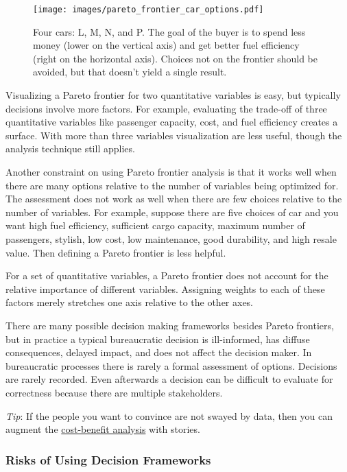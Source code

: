 \begin{figure}[ht]
    \centering
    \texttt{[image: images/pareto\_frontier\_car\_options.pdf]}
    \caption{Four cars: L, M, N, and P. The goal of the buyer is to spend less money (lower on the vertical axis) and get better fuel efficiency (right on the horizontal axis). Choices not on the frontier should be avoided, but that doesn't yield a single result.}
    \label{fig:pareto_frontier_cars}
\end{figure}

Visualizing a Pareto frontier for two quantitative variables is easy, but typically decisions involve more factors. For example, evaluating the trade-off of three quantitative variables like 
passenger capacity, cost, and fuel efficiency creates a surface. With more than three variables visualization are less useful, though the analysis technique still applies. 

Another constraint on using Pareto frontier analysis is that it works well when there are many options relative to the number of variables being optimized for. 
The assessment does not work as well when there are few choices relative to the number of variables. For example, suppose there are five choices of car and you want high fuel efficiency, sufficient cargo capacity, maximum number of passengers, stylish, low cost, low maintenance, good durability, and high resale value. Then defining a Pareto frontier is less helpful.

For a set of quantitative variables, a Pareto frontier does not account for the relative importance of different variables. Assigning weights to each of these factors merely stretches one axis relative to the other axes. 

There are many possible decision making frameworks besides Pareto frontiers, but in practice a typical bureaucratic decision is ill-informed, has diffuse consequences, delayed impact, and does not affect the decision maker. In bureaucratic processes there is rarely a formal assessment of options. 
Decisions are rarely recorded. 
Even afterwards a decision can be difficult to evaluate for correctness because there are multiple stakeholders.

\textit{Tip}: If the people you want to convince are not swayed by data, then you can augment the \href{https://en.wikipedia.org/wiki/Cost\%E2\%80\%93benefit_analysis}{cost-benefit analysis} with stories. 

\subsubsection{Risks of Using Decision Frameworks}

